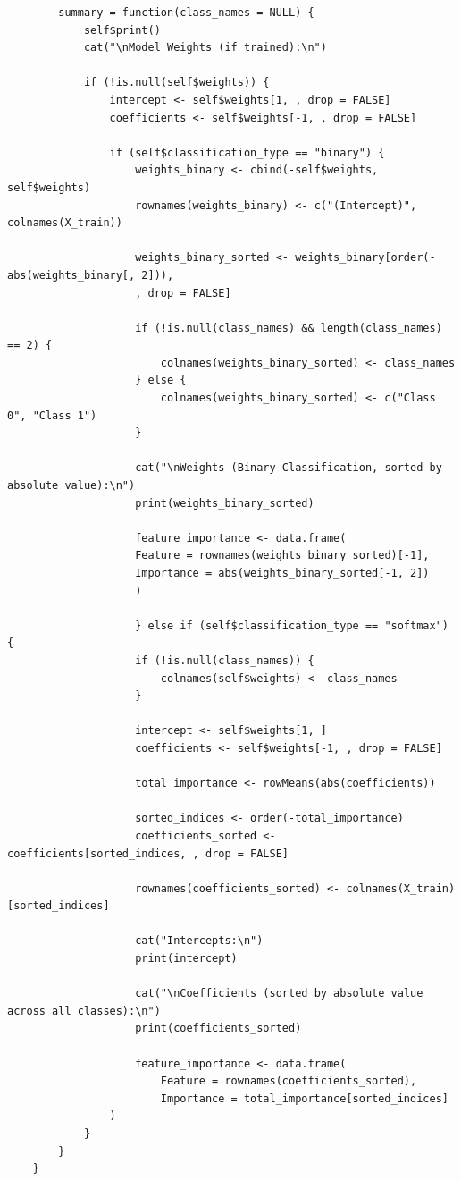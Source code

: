 \documentclass[10pt,french]{report}
\begin{document}
    \begin{verbatim}
    	summary = function(class_names = NULL) {
      		self$print()
      		cat("\nModel Weights (if trained):\n")

      		if (!is.null(self$weights)) {
        		intercept <- self$weights[1, , drop = FALSE]  
        		coefficients <- self$weights[-1, , drop = FALSE]  

        		if (self$classification_type == "binary") {
          			weights_binary <- cbind(-self$weights, self$weights)  
          			rownames(weights_binary) <- c("(Intercept)", colnames(X_train)) 

          			weights_binary_sorted <- weights_binary[order(-abs(weights_binary[, 2])), 
          			, drop = FALSE]

          			if (!is.null(class_names) && length(class_names) == 2) {
            			colnames(weights_binary_sorted) <- class_names  
          			} else {
            			colnames(weights_binary_sorted) <- c("Class 0", "Class 1") 
          			}

          			cat("\nWeights (Binary Classification, sorted by absolute value):\n")
          			print(weights_binary_sorted)

          			feature_importance <- data.frame(
            		Feature = rownames(weights_binary_sorted)[-1],  
            		Importance = abs(weights_binary_sorted[-1, 2])  
          			)

        			} else if (self$classification_type == "softmax") {
          			if (!is.null(class_names)) {
            			colnames(self$weights) <- class_names
          			}

          			intercept <- self$weights[1, ]  
          			coefficients <- self$weights[-1, , drop = FALSE]  

          			total_importance <- rowMeans(abs(coefficients))

          			sorted_indices <- order(-total_importance)
          			coefficients_sorted <- coefficients[sorted_indices, , drop = FALSE]

          			rownames(coefficients_sorted) <- colnames(X_train)[sorted_indices]  

          			cat("Intercepts:\n")
          			print(intercept)

          			cat("\nCoefficients (sorted by absolute value across all classes):\n")
          			print(coefficients_sorted)

          			feature_importance <- data.frame(
            			Feature = rownames(coefficients_sorted),
            			Importance = total_importance[sorted_indices]
          		)
        	}
		}
	}
    \end{verbatim}
\end{document}
